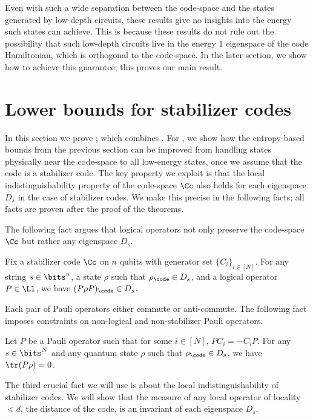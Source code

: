 \documentclass{toc}
\begin{document}
Even with such a wide separation between the code-space and the states generated by low-depth circuits,
%
these results give no insights into the energy such states can achieve. This is because these results do not rule out the possibility that such low-depth circuits
%
live in the energy $1$ eigenspace of the code Hamiltonian, which is orthogonal to the code-space. In the later section, we show how to achieve this guarantee; this proves our main result.


\section{Lower bounds for stabilizer codes}
\label{sec:main}

In this section we prove ; {which combines  . For }, we show how the entropy-based bounds from the previous section can be improved from handling states physically near the code-space to all low-energy states, once we assume that the code is a stabilizer code. The key property we exploit is that the local indistinguishability property of the code-space $\Cc$ also holds for each eigenspace $D_s$ in the case of stabilizer codes. We make this precise in the following facts; all facts are proven after the proof of the theorems.

The following fact argues that logical operators not only preserve the code-space $\Cc$ but rather any eigenspace $D_s$.

\begin{fact}
\label{fact:logact}
Fix a stabilizer code $\Cc$ on $n$ qubits with generator set $\{C_i\}_{i \in [N]}$. For any string $s \in \bits^{n}$, a state $\rho$ such that $\rho_\code \in D_s$, and a logical operator $P \in \Ll$, we have $(P\rho P)_{\code} \in D_s$.
\end{fact}

Each pair of Pauli operators either commute or anti-commute. The following fact imposes constraints on non-logical and non-stabilizer Pauli operators.

\begin{fact}
\label{fact:zeroexp}
Let $P$ be a Pauli operator such that for some $i \in [N]$, $P C_i = - C_i P$. For any $s \in \bits^{N}$ and any quantum state $\rho$ such that $\rho_\code \in D_s$, we have $\tr(P \rho) = 0$.
\end{fact}

The third crucial fact we will use is about the local indistinguishability of stabilizer codes. We will show that the measure of any local operator of locality $< d$, the distance of the code, is an invariant of each eigenspace $D_s$.
\end{document}

